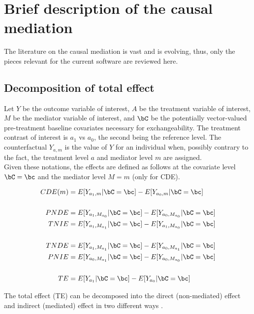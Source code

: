 \documentclass[dvipdfmx,10pt]{article}
\date{\today}
\title{}
\begin{document}
\tableofcontents

\sloppy
\newpage
\section{Brief description of the causal mediation}
\label{sec:orgefe5071}

The literature on the causal mediation is vast \cite{vanderweeleExplanationCausalInference2015} and is evolving, thus, only the pieces relevant for the current software are reviewed here.

\subsection{Decomposition of total effect}
\label{sec:orga05a1ff}
Let \(Y\) be the outcome variable of interest, \(A\) be the treatment variable of interest, \(M\) be the mediator variable of interest, and \(\bC\) be the potentially vector-valued pre-treatment baseline covariates necessary for exchangeability. The treatment contrast of interest is \(a_{1}\) vs \(a_{0}\), the second being the reference level. The counterfactual \(Y_{a,m}\) is the value of \(Y\) for an individual when, possibly contrary to the fact, the treatment level \(a\) and mediator level \(m\) are assigned.\\

Given these notations, the effects are defined as follows at the covariate level \(\bC = \bc\) and the mediator level \(M = m\) (only for CDE).

\begin{align*}
  CDE(m) &= E[Y_{a_{1},m} | \bC = \bc] - E[Y_{a_{0},m} | \bC = \bc]\\
  \\
  PNDE &= E[Y_{a_{1},M_{a_{0}}} | \bC = \bc] - E[Y_{a_{0},M_{a_{0}}} | \bC = \bc]\\
  TNIE &= E[Y_{a_{1},M_{a_{1}}} | \bC = \bc] - E[Y_{a_{1},M_{a_{0}}} | \bC = \bc]\\
  \\
  TNDE &= E[Y_{a_{1},M_{a_{1}}} | \bC = \bc] - E[Y_{a_{0},M_{a_{1}}} | \bC = \bc]\\
  PNIE &= E[Y_{a_{0},M_{a_{1}}} | \bC = \bc] - E[Y_{a_{0},M_{a_{0}}} | \bC = \bc]\\
  \\
  TE &= E[Y_{a_{1}} | \bC = \bc] - E[Y_{a_{0}} | \bC = \bc]\\
\end{align*}

The total effect (TE) can be decomposed into the direct (non-mediated) effect and indirect (mediated) effect in two different ways \cite{robinsIdentifiabilityExchangeabilityDirect1992,vanderweeleThreewayDecompositionTotal2013}.\\
\end{document}
